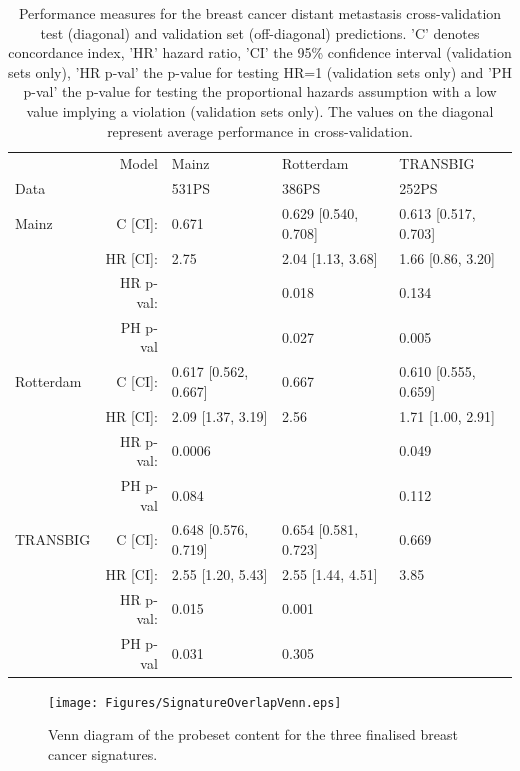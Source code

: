 \documentclass[letterpaper,12pt]{article}
\begin{document}

\begin{table}[h]
\centering
\caption{Performance measures for the breast cancer distant metastasis cross-validation test (diagonal) and validation set (off-diagonal) predictions. 'C' denotes concordance index, 'HR' hazard ratio, 'CI' the 95\% confidence interval (validation sets only), 'HR p-val' the p-value for testing HR=1 (validation sets only) and 'PH p-val' the p-value for testing the proportional hazards assumption with a low value implying a violation (validation sets only). The values on the diagonal represent average performance in cross-validation.}
\label{Table:HRTable2}
\begin{small}
    \begin{tabular}{ | l r | l | l | l |} 
    \hline
     & Model & Mainz & Rotterdam & TRANSBIG \\ Data & & 531PS & 386PS & 252PS \\\hline \hline
    Mainz & C [CI]:& 0.671& 0.629 [0.540, 0.708]& 0.613 [0.517, 0.703]\\ &HR [CI]:& 2.75 & 2.04 [1.13, 3.68]&1.66 [0.86, 3.20]\\ &HR p-val:& & 0.018&0.134\\ &PH p-val& & 0.027& 0.005\\\hline
		Rotterdam  & C [CI]:& 0.617 [0.562, 0.667]& 0.667& 0.610 [0.555, 0.659]\\ &HR [CI]:& 2.09 [1.37, 3.19]& 2.56 &1.71 [1.00, 2.91]\\ &HR p-val:& 0.0006&&0.049\\ &PH p-val& 0.084& & 0.112\\\hline
		TRANSBIG  & C [CI]:& 0.648 [0.576, 0.719]& 0.654 [0.581, 0.723]& 0.669\\ &HR [CI]:& 2.55 [1.20, 5.43]& 2.55 [1.44, 4.51]& 3.85\\ &HR p-val:& 0.015& 0.001&\\ &PH p-val& 0.031& 0.305 &\\\hline
    \end{tabular}
\end{small}
\end{table}

\begin{figure}[!th]
\centering
\texttt{[image: Figures/SignatureOverlapVenn.eps]}
\caption{Venn diagram of the probeset content for the three finalised breast cancer signatures.}
\label{Fig:Venn3}
\end{figure}
\end{document}
